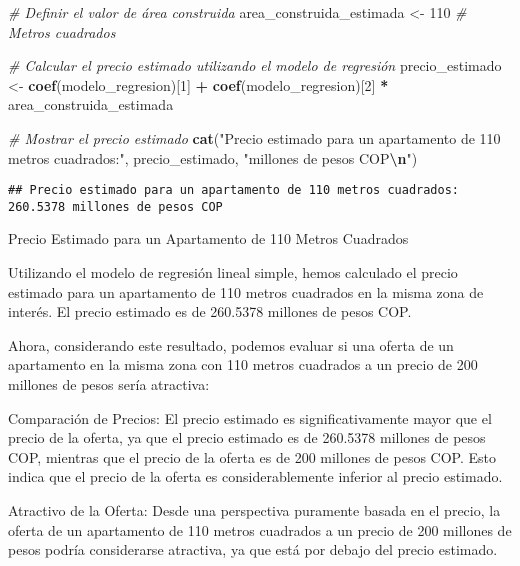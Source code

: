 \documentclass[
]{article}
\newenvironment{Shaded}{\begin{snugshade}}{\end{snugshade}}
\newcommand{\CommentTok}[1]{\textcolor[rgb]{0.56,0.35,0.01}{\textit{#1}}}
\newcommand{\DecValTok}[1]{\textcolor[rgb]{0.00,0.00,0.81}{#1}}
\newcommand{\FunctionTok}[1]{\textcolor[rgb]{0.13,0.29,0.53}{\textbf{#1}}}
\newcommand{\NormalTok}[1]{#1}
\newcommand{\OtherTok}[1]{\textcolor[rgb]{0.56,0.35,0.01}{#1}}
\newcommand{\SpecialCharTok}[1]{\textcolor[rgb]{0.81,0.36,0.00}{\textbf{#1}}}
\newcommand{\StringTok}[1]{\textcolor[rgb]{0.31,0.60,0.02}{#1}}
\begin{document}
\begin{Shaded}
\begin{Highlighting}[]
\CommentTok{\# Definir el valor de área construida}
\NormalTok{area\_construida\_estimada }\OtherTok{\textless{}{-}} \DecValTok{110}  \CommentTok{\# Metros cuadrados}

\CommentTok{\# Calcular el precio estimado utilizando el modelo de regresión}
\NormalTok{precio\_estimado }\OtherTok{\textless{}{-}} \FunctionTok{coef}\NormalTok{(modelo\_regresion)[}\DecValTok{1}\NormalTok{] }\SpecialCharTok{+} \FunctionTok{coef}\NormalTok{(modelo\_regresion)[}\DecValTok{2}\NormalTok{] }\SpecialCharTok{*}\NormalTok{ area\_construida\_estimada}

\CommentTok{\# Mostrar el precio estimado}
\FunctionTok{cat}\NormalTok{(}\StringTok{"Precio estimado para un apartamento de 110 metros cuadrados:"}\NormalTok{, precio\_estimado, }\StringTok{"millones de pesos COP}\SpecialCharTok{\textbackslash{}n}\StringTok{"}\NormalTok{)}
\end{Highlighting}
\end{Shaded}

\begin{verbatim}
## Precio estimado para un apartamento de 110 metros cuadrados: 260.5378 millones de pesos COP
\end{verbatim}

Precio Estimado para un Apartamento de 110 Metros Cuadrados

Utilizando el modelo de regresión lineal simple, hemos calculado el
precio estimado para un apartamento de 110 metros cuadrados en la misma
zona de interés. El precio estimado es de 260.5378 millones de pesos
COP.

Ahora, considerando este resultado, podemos evaluar si una oferta de un
apartamento en la misma zona con 110 metros cuadrados a un precio de 200
millones de pesos sería atractiva:

Comparación de Precios: El precio estimado es significativamente mayor
que el precio de la oferta, ya que el precio estimado es de 260.5378
millones de pesos COP, mientras que el precio de la oferta es de 200
millones de pesos COP. Esto indica que el precio de la oferta es
considerablemente inferior al precio estimado.

Atractivo de la Oferta: Desde una perspectiva puramente basada en el
precio, la oferta de un apartamento de 110 metros cuadrados a un precio
de 200 millones de pesos podría considerarse atractiva, ya que está por
debajo del precio estimado.
\end{document}
